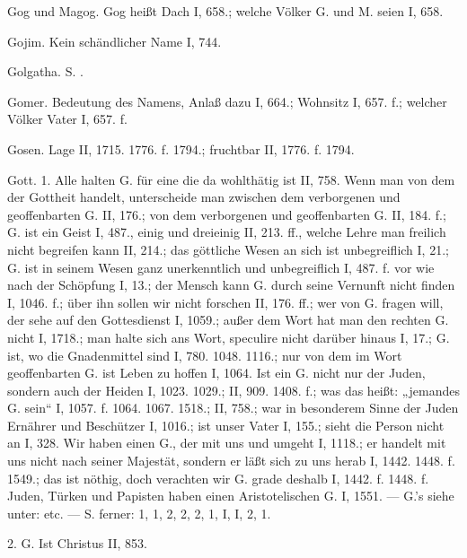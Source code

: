 Gog und Magog. Gog heißt Dach I, 658.; welche Völker G. und M. seien I, 658.

Gojim. Kein schändlicher Name I, 744.

Golgatha. S. .

Gomer. Bedeutung des Namens, Anlaß dazu I, 664.; Wohnsitz I, 657. f.; welcher Völker Vater I, 657. f.

Gosen. Lage II, 1715. 1776. f. 1794.; fruchtbar II, 1776. f. 1794.

Gott. 1.  Alle halten G. für eine  die da wohlthätig ist II, 758. Wenn man von dem  der Gottheit handelt, unterscheide man zwischen dem verborgenen und geoffenbarten G. II, 176.; von dem verborgenen und geoffenbarten G. II, 184. f.; G. ist ein Geist I, 487., einig und dreieinig II, 213. ff., welche Lehre man freilich nicht begreifen kann II, 214.; das göttliche Wesen an sich ist unbegreiflich I, 21.; G. ist in seinem Wesen ganz unerkenntlich und unbegreiflich I, 487. f. vor wie nach der Schöpfung I, 13.; der Mensch kann G. durch seine Vernunft nicht finden I, 1046. f.; über ihn sollen wir nicht forschen II, 176. ff.; wer von G. fragen will, der sehe auf den Gottesdienst I, 1059.; außer dem Wort hat man den rechten G. nicht I, 1718.; man halte sich ans Wort, speculire nicht darüber hinaus I, 17.; G. ist, wo die Gnadenmittel sind I, 780. 1048. 1116.; nur von dem im Wort geoffenbarten G. ist Leben zu hoffen I, 1064. Ist ein G. nicht nur der Juden, sondern auch der Heiden I, 1023. 1029.; II, 909. 1408. f.; was das heißt: „jemandes G. sein“ I, 1057. f. 1064. 1067. 1518.; II, 758.; war in besonderem Sinne der Juden Ernährer und Beschützer I, 1016.; ist unser Vater I, 155.; sieht die Person nicht an I, 328. Wir haben einen G., der mit uns  und umgeht I, 1118.; er handelt mit uns nicht nach seiner Majestät, sondern er läßt sich zu uns herab I, 1442. 1448. f. 1549.; das ist nöthig, doch verachten wir G. grade deshalb I, 1442. f. 1448. f. Juden, Türken und Papisten haben einen Aristotelischen G. I, 1551. —  G.’s siehe unter:  etc. — S. ferner:  1,  1, 2,  2,  2,  1,  I,  I,  2,  1.

2.  G.  Ist Christus II, 853.

